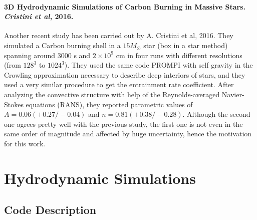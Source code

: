 \documentclass[11pt]{article}
\numberwithin{equation}{section}
\begin{document}
\paragraph{3D Hydrodynamic Simulations of Carbon Burning in Massive Stars. \textit{Cristini et al}, 2016.} 
Another recent study has been carried out by A. Cristini et al, 2016. They simulated a Carbon burning shell in a $15 M_{\odot}$ star (box in a star method) spanning around $3000$ s and $2 \times 10^9$ cm in four runs with different resolutions (from $128^3$ to $1024^3$). They used the same code PROMPI with self gravity in the Crowling approximation necessary to describe deep interiors of stars, and they used a very similar procedure to get the entrainment rate coefficient. After analyzing the convective structure with help of the Reynolds-averaged Navier-Stokes equations (RANS), they reported parametric values of $A= 0.06 (+0.27 / -0.04)$ and $n= 0.81 (+0.38 / -0.28)$. Although the second one agrees pretty well with the previous study, the first one is not even in the same order of magnitude and affected by huge uncertainty, hence the motivation for this work.


\section{Hydrodynamic Simulations}
\subsection{Code Description}
\end{document}
